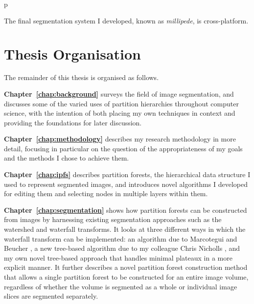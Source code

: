 \begin{stusubfig}{p}
\caption{The final segmentation system I developed, known as \emph{millipede}, is cross-platform.}
\label{fig:introduction-millipede-seg}
\end{stusubfig}


\section*{Thesis Organisation}

The remainder of this thesis is organised as follows.

\textbf{Chapter~\ref{chap:background}} surveys the field of image segmentation, and discusses some of the varied uses of partition hierarchies throughout computer science, with the intention of both placing my own techniques in context and providing the foundations for later discussion.

\textbf{Chapter~\ref{chap:methodology}} describes my research methodology in more detail, focusing in particular on the question of the appropriateness of my goals and the methods I chose to achieve them.

\textbf{Chapter~\ref{chap:ipfs}} describes partition forests, the hierarchical data structure I used to represent segmented images, and introduces novel algorithms I developed for editing them and selecting nodes in multiple layers within them.

\textbf{Chapter~\ref{chap:segmentation}} shows how partition forests can be constructed from images by harnessing existing segmentation approaches such as the watershed and waterfall transforms. It looks at three different ways in which the waterfall transform can be implemented: an algorithm due to Marcotegui and Beucher \cite{marcotegui05}, a new tree-based algorithm due to my colleague Chris Nicholls \cite{nicholls09}, and my own novel tree-based approach that handles minimal plateaux in a more explicit manner. It further describes a novel partition forest construction method that allows a single partition forest to be constructed for an entire image volume, regardless of whether the volume is segmented as a whole or individual image slices are segmented separately.

